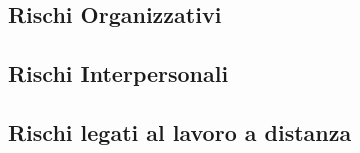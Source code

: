 	\subsection{Rischi Organizzativi}
	\subsection{Rischi Interpersonali}
	\subsection{Rischi legati al lavoro a distanza}